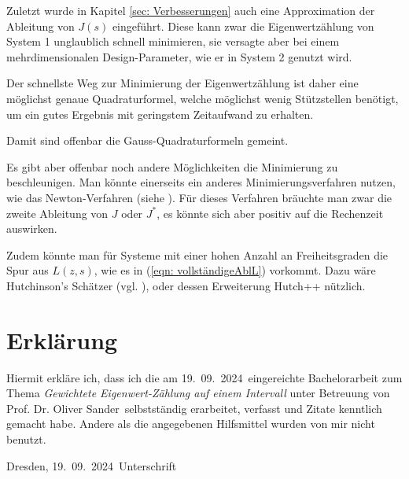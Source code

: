 \documentclass[a4paper,12pt]{report}
\newcommand{\betreuer}{Prof. Dr. Oliver Sander}
\newcommand{\thema}{Gewichtete Eigenwert-Zählung auf einem Intervall}
\newcommand{\datum}{19.\ 09.\ 2024} %
\newcommand{\zitat}[1]{\glqq #1\grqq}
\newcommand{\1}{\mathds{1}}
\theoremstyle{plain} %
\theoremstyle{definition} %
\theoremstyle{remark}
\begin{document}
      Zuletzt wurde in Kapitel \ref{sec: Verbesserungen} auch eine Approximation der Ableitung von $J(s)$ eingeführt.
      Diese kann zwar die Eigenwertzählung von System 1 unglaublich schnell minimieren, sie versagte aber bei einem mehrdimensionalen Design-Parameter, wie er in System 2 genutzt wird.

      Der schnellste Weg zur Minimierung der Eigenwertzählung ist daher eine möglichst genaue Quadraturformel,
      welche möglichst wenig Stützstellen benötigt, um ein gutes Ergebnis mit geringstem Zeitaufwand zu erhalten.

      Damit sind offenbar die Gauss-Quadraturformeln gemeint.

      Es gibt aber offenbar noch andere Möglichkeiten die Minimierung zu beschleunigen.
      Man könnte einerseits ein anderes Minimierungsverfahren nutzen, wie das Newton-Verfahren (siehe \cite[S. 290]{optimierungBurkhard}).
      Für dieses Verfahren bräuchte man zwar die zweite Ableitung von $J$ oder $J^*$, es könnte sich aber positiv auf die Rechenzeit auswirken.

      Zudem könnte man für Systeme mit einer hohen Anzahl an Freiheitsgraden die Spur aus $L(z,s)$, wie es in (\ref{eqn: vollständigeAblL}) vorkommt.
      Dazu wäre Hutchinson's Schätzer (vgl. \cite[S. 142]{hutch++Meyer}), oder dessen Erweiterung \zitat{Hutch++}\cite[S. 142]{hutch++Meyer} nützlich.


\printbibliography

\listoffigures
\chapter*{Erkl\"{a}rung}
\thispagestyle{empty}
Hiermit erkl\"{a}re ich, dass ich die am \datum\ eingereichte Bachelorarbeit zum Thema
\emph{\thema} unter Betreuung von \betreuer\ selbstst\"{a}ndig erarbeitet,
verfasst und Zitate kenntlich gemacht habe. Andere als die angegebenen Hilfsmittel
wurden von mir nicht benutzt.

\bigskip \bigskip \bigskip \bigskip \bigskip

Dresden, \datum\ \hfill Unterschrift

\normalsize
\end{document}
